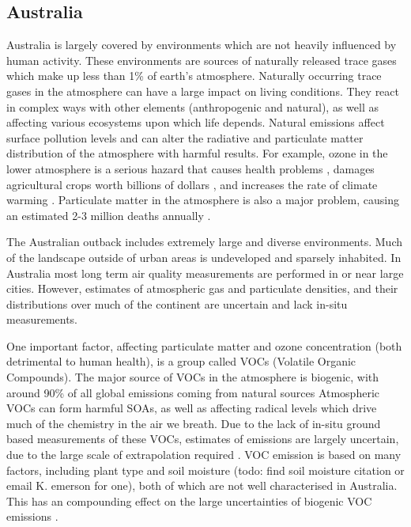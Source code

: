   \subsection{Australia}

    Australia is largely covered by environments which are not heavily influenced by human activity.
    These environments are sources of naturally released trace gases which make up less than 1\% of earth's atmosphere.
    Naturally occurring trace gases in the atmosphere can have a large impact on living conditions.
    They react in complex ways with other elements (anthropogenic and natural), as well as affecting various ecosystems upon which life depends.
    Natural emissions affect surface pollution levels and can alter the radiative and particulate matter distribution of the atmosphere with harmful results.
    For example, ozone in the lower atmosphere is a serious hazard that causes health problems \citep{Hsieh2013}, damages agricultural crops worth billions of dollars \citep{Avnery2011}, and increases the rate of climate warming \citep{IPCC_2013_chap8}.
    Particulate matter in the atmosphere is also a major problem, causing an estimated 2-3 million deaths annually \citep{Hoek2013, Krewski2009, Silva2013, Lelieveld2015}.

    The Australian outback includes extremely large and diverse environments.
    Much of the landscape outside of urban areas is undeveloped and sparsely inhabited.
    In Australia most long term air quality measurements are performed in or near large cities.
    However, estimates of atmospheric gas and particulate densities, and their distributions over much of the continent are uncertain and lack in-situ measurements.
    
    One important factor, affecting particulate matter and ozone concentration (both detrimental to human health), is a group called VOCs (Volatile Organic Compounds).
    The major source of VOCs in the atmosphere is biogenic, with around 90\% of all global emissions coming from natural sources \citep{Guenther1995,Guenther2006, Millet2006}
    Atmospheric VOCs can form harmful SOAs, as well as affecting radical levels which drive much of the chemistry in the air we breath.
    Due to the lack of in-situ ground based measurements of these VOCs, estimates of emissions are largely uncertain, due to the large scale of extrapolation required \citet{Millet2006}.
    VOC emission is based on many factors, including plant type and soil moisture (todo: find soil moisture citation or email K. emerson for one), both of which are not well characterised in Australia.
    This has an compounding effect on the large uncertainties of biogenic VOC emissions \citep{Guenther2000, Millet2006}.

